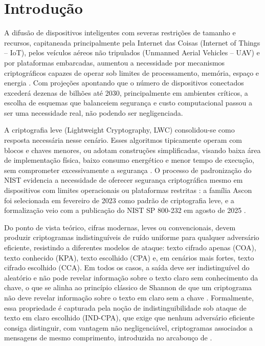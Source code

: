 \chapter{Introdução}

A difusão de dispositivos inteligentes com severas restrições de tamanho e recursos, capitaneada principalmente pela Internet das Coisas (Internet of Things -- IoT), pelos veículos aéreos não tripulados (Unmanned Aerial Vehicles -- UAV) e por plataformas embarcadas, aumentou a necessidade por mecanismos criptográficos capazes de operar sob limites de processamento, memória, espaço e energia \cite{Gusita2021LightweightMCDM}. Com projeções apontando que o número de dispositivos conectados excederá dezenas de bilhões até 2030, principalmente em ambientes críticos, a escolha de esquemas que balanceiem segurança e custo computacional passou a ser uma necessidade real, não podendo ser negligenciada.

A criptografia leve (Lightweight Cryptography, LWC) consolidou-se como resposta necessária nesse cenário. Esses algoritmos tipicamente operam com blocos e chaves menores, ou adotam construções simplificadas, visando baixa área de implementação física, baixo consumo energético e menor tempo de execução, sem comprometer excessivamente a segurança \cite{Radhakrishnan2024LWC_MCDM}. O processo de padronização do NIST evidencia a necessidade de oferecer segurança criptográfica mesmo em dispositivos com limites operacionais ou plataformas restritas \cite{Turan2023NISTLWCFinal}: a família Ascon foi selecionada em fevereiro de 2023 como padrão de criptografia leve, e a formalização veio com a publicação do NIST SP 800-232 em agosto de 2025 \cite{nist_sp800232_2025}.

Do ponto de vista teórico, cifras modernas, leves ou convencionais, devem produzir criptogramas indistinguíveis de ruído uniforme para qualquer adversário eficiente, resistindo a diferentes modelos de ataque: texto cifrado apenas (COA), texto conhecido (KPA), texto escolhido (CPA) e, em cenários mais fortes, texto cifrado escolhido (CCA). Em todos os casos, a saída deve ser indistinguível do aleatório e não pode revelar informação sobre o texto claro sem conhecimento da chave, o que se alinha ao princípio clássico de Shannon de que um criptograma não deve revelar informação sobre o texto em claro sem a chave \cite{ShannonWeaver1949MTC, Rukhin2010NIST80022}. Formalmente, essa propriedade é capturada pela noção de indistinguibilidade sob ataque de texto em claro escolhido (IND-CPA), que exige que nenhum adversário eficiente consiga distinguir, com vantagem não negligenciável, criptogramas associados a mensagens de mesmo comprimento, introduzida no arcabouço de .


